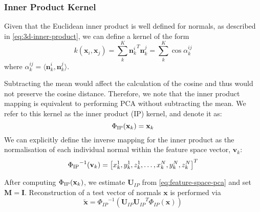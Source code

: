\subsubsection{Inner Product Kernel}\label{subsubsec:sing_img_ip_kernel}
Given that the Euclidean inner product is well defined for normals, as 
described in \cref{eq:3d-inner-product}, we can define a kernel of the form
\begin{equation}\label{eq:ip-cosine-kernel}
    k(\mathbf{x}_i, \mathbf{x}_j) = \sum^K_k {\mathbf{n}_k^i}^T \mathbf{n}_k^j = \sum^K_k \cos \alpha^{ij}_k
\end{equation}
where $\alpha^{ij}_k = \langle \mathbf{n}^i_k, \mathbf{n}^j_k \rangle$.

Subtracting the mean would affect the calculation of the cosine and thus would 
not preserve the cosine distance. Therefore, we note that the inner product 
mapping is equivalent to performing PCA without subtracting the mean. We refer 
to this kernel as the inner product (IP) kernel, and denote it as:
\begin{equation}\label{eq:ip-kernel}
    \Phi_{\operatorname{IP}} (\boldsymbol{\mathbf{x}}_k) = \mathbf{x}_k
\end{equation}
We can explicitly define the inverse mapping for the inner product as the 
normalisation of each individual normal within the feature space vector,
 $\mathbf{v}_k$:
\begin{equation}\label{eq:inv-ip-kernel}
    {\Phi_{\operatorname{IP}}}^{-1} (\boldsymbol{\mathbf{v}}_k) = \left[ x_k^1, y_k^1, z_k^1, \ldots, x_k^N, y_k^N, z_k^N \right]^T
\end{equation}

After computing $\Phi_{\operatorname{IP}} (\boldsymbol{\mathbf{x}}_k)$, we estimate $\mathbf{U}_{IP}$ from 
\cref{eq:feature-space-pca} and set $\mathbf{M} = \mathbf{I}$. 
Reconstruction of a test vector of normals $\mathbf{x}$ is performed via
\begin{equation}\label{eq:ip-reconstruction}
   \tilde{\mathbf{x}} = {\Phi_{IP}}^{-1} \left( \mathbf{U}_{IP} {\mathbf{U}_{IP}}^T \Phi_{IP}(\mathbf{x}) \right)
\end{equation}
